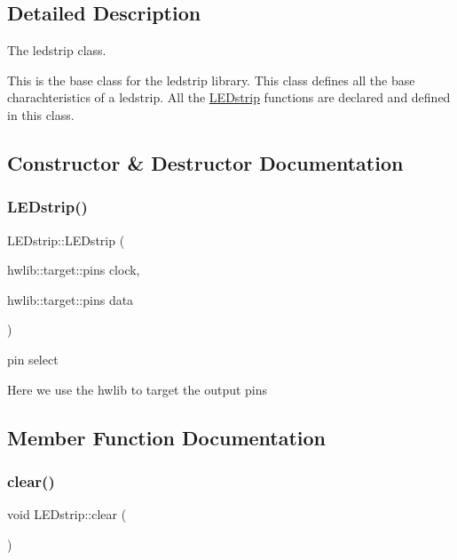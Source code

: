 \subsection{Detailed Description}
The ledstrip class. 

This is the base class for the ledstrip library. This class defines all the base charachteristics of a ledstrip. All the \hyperlink{class_l_e_dstrip}{L\+E\+Dstrip} functions are declared and defined in this class. 

\subsection{Constructor \& Destructor Documentation}
\mbox{\label{class_l_e_dstrip_ab61e240ec69725f220ff443fd0296d42}} 
\subsubsection{\texorpdfstring{L\+E\+Dstrip()}{LEDstrip()}}
{\footnotesize\ttfamily L\+E\+Dstrip\+::\+L\+E\+Dstrip (\begin{DoxyParamCaption}\item[{hwlib\+::target\+::pins}]{clock,  }\item[{hwlib\+::target\+::pins}]{data }\end{DoxyParamCaption})}



pin select 

Here we use the hwlib to target the output pins 

\subsection{Member Function Documentation}
\mbox{\label{class_l_e_dstrip_a29a03486eed0eeb722908d9145c22003}} 
\subsubsection{\texorpdfstring{clear()}{clear()}}
{\footnotesize\ttfamily void L\+E\+Dstrip\+::clear (\begin{DoxyParamCaption}{ }\end{DoxyParamCaption})}




